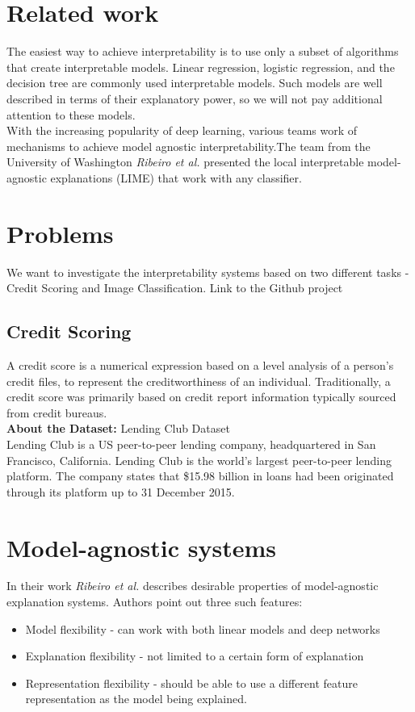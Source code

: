 \section{Related work}
The easiest way to achieve interpretability is to use only a subset of algorithms that create interpretable models. Linear regression, logistic regression, and the decision tree are commonly used interpretable models.\cite{molnar2019}
Such models are well described in terms of their explanatory power, so we will not pay additional attention to these models. \\
With the increasing popularity of deep learning, various teams work of mechanisms to achieve model agnostic interpretability\cite{ribeiro2016model}.The team from the University of Washington \textit{Ribeiro et al.}\cite{RibeiroSG16}  presented the local interpretable model-agnostic explanations (LIME) that work with any classifier. 

\section{Problems}
We want to investigate the interpretability systems based on two different tasks - Credit Scoring and Image Classification. Link to the Github project\cite{Project}

\subsection{Credit Scoring}
A credit score is a numerical expression based on a level analysis of a person's credit files, to represent the creditworthiness of an individual. Traditionally, a credit score was primarily based on credit report information typically sourced from credit bureaus. \\
\textbf{About the Dataset:} Lending Club Dataset \\
Lending Club is a US peer-to-peer lending company, headquartered in San Francisco, California. Lending Club is the world's largest peer-to-peer lending platform. The company states that \$15.98 billion in loans had been originated through its platform up to 31 December 2015.


\section{Model-agnostic systems}
In their work \textit{Ribeiro et al.}\cite{ribeiro2016model} describes desirable properties of model-agnostic explanation systems. Authors point out three such features:
\begin{itemize}
    \item Model flexibility -  can work with both linear models and deep networks
    \item Explanation flexibility - not limited to a certain form of explanation
    \item Representation flexibility - should be able to use a different feature representation as the model being explained. 
\end{itemize}

